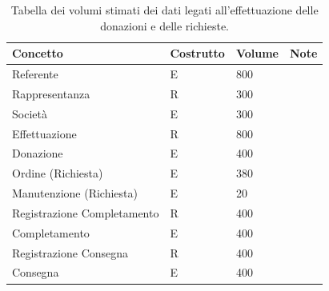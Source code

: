 \documentclass[a4paper,12pt]{report}
\begin{document}
\begin{table}[H]
	\begin{center}
	    	\begin{tabular}{A|C|B|A}
	      	\toprule
	      		\textbf{Concetto} & \textbf{Costrutto} & \textbf{Volume} & \textbf{Note} \\
	      	\midrule
					\hline
					Referente
					& E
					& 800
					& \\
					\hline
					Rappresentanza
					& R
					& 300
					& \\
					\hline
					Società
					& E
					& 300
					& \\
					\hline
					Effettuazione
					& R
					& 800
					& \\
					\hline
					Donazione
					& E
					& 400
					& \\
					\hline
					Ordine (Richiesta)
					& E
					& 380
					& \\
					\hline
					Manutenzione (Richiesta)
					& E
					& 20
					& \\
					\hline
					Registrazione Completamento
					& R
					& 400
					& \\
					\hline
					Completamento
					& E
					& 400
					& \\
					\hline
					Registrazione Consegna
					& R
					& 400
					& \\
					\hline
					Consegna
					& E
					& 400
					& \\
	      	\bottomrule
	    	\end{tabular}
	\end{center}
	\caption{Tabella dei volumi stimati dei dati legati all'effettuazione delle donazioni e delle richieste.}
    	\label{tab:tabella-volumi-1}
\end{table}
\end{document}
